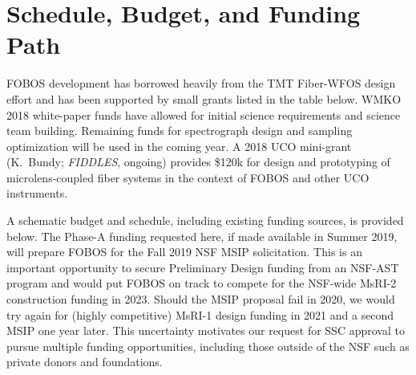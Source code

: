 
\section{Schedule, Budget, and Funding Path}
\label{sec:budget}

FOBOS development has borrowed heavily from the TMT Fiber-WFOS design
effort and has been supported by small grants listed in the table
below. WMKO 2018 white-paper funds have allowed for initial science
requirements and science team building. Remaining funds for
spectrograph design and sampling optimization will be used in the
coming year. A 2018 UCO mini-grant (K.~Bundy; {\it FIDDLES}, ongoing)
provides \$120k for design and prototyping of microlens-coupled fiber
systems in the context of FOBOS and other UCO instruments.






A schematic budget and schedule, including existing funding sources,
is provided below. The Phase-A funding requested here, if made
available in Summer 2019, will prepare FOBOS for the Fall 2019 NSF
MSIP solicitation. This is an important opportunity to secure
Preliminary Design funding from an NSF-AST program and would put
FOBOS on track to compete for the NSF-wide MsRI-2 construction
funding in 2023. Should the MSIP proposal fail in 2020, we would try
again for (highly competitive) MsRI-1 design funding in 2021 and a
second MSIP one year later. This uncertainty motivates our request
for SSC approval to pursue multiple funding opportunities, including
those outside of the NSF such as private donors and foundations.

